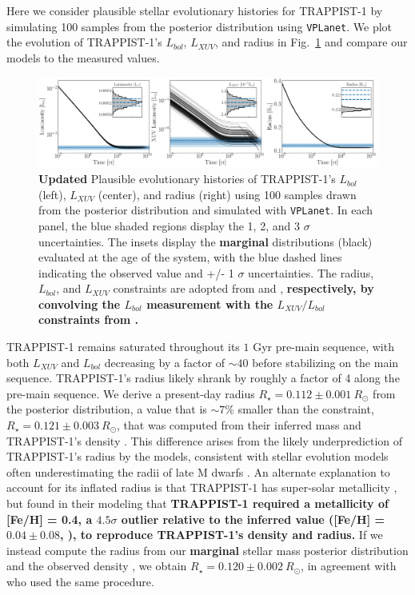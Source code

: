 \documentclass[twocolumn]{aastex62}
\newcommand{\xxx}[1]{{\textbf{#1}}}
\newcommand{\vplanet}[0]{\texttt{VPLanet}\xspace}
\begin{document}
Here we consider plausible stellar evolutionary histories for TRAPPIST-1 by simulating 100 samples from the posterior distribution using \vplanet. We plot the evolution of TRAPPIST-1's $L_{bol}$, $L_{XUV}$, and radius in Fig.~\ref{fig:evol} and compare our models to the measured values. 

\begin{figure}[t]
	\includegraphics[width=\textwidth]{../Analysis/Evol/trappist1Evol.pdf}
   \caption{\xxx{Updated} Plausible evolutionary histories of TRAPPIST-1's $L_{bol}$ (left), $L_{XUV}$ (center), and radius (right) using 100 samples drawn from the posterior distribution and simulated with \vplanet. In each panel, the blue shaded regions display the 1, 2, and 3 $\sigma$ uncertainties. The insets display the \xxx{marginal} distributions (black) evaluated at the age of the system, with the blue dashed lines indicating the observed value and +/- 1 $\sigma$ uncertainties. The radius, $L_{bol}$, and $L_{XUV}$ constraints are adopted from \citet{vanGrootel2018} and \citet{Wheatley2017}, \xxx{respectively, by convolving the \citet{vanGrootel2018} $L_{bol}$ measurement with the $L_{XUV}/L_{bol}$ constraints from \citet{Wheatley2017}.}}%
    \label{fig:evol}%
\end{figure}

TRAPPIST-1 remains saturated throughout its $1$ Gyr pre-main sequence, with both $L_{XUV}$ and $L_{bol}$ decreasing by a factor of ${\sim}40$ before stabilizing on the main sequence. TRAPPIST-1's radius likely shrank by roughly a factor of 4 along the pre-main sequence. We derive a present-day radius $R_{\star} = 0.112 \pm{0.001} \ R_{\odot}$ from the posterior distribution, a value that is ${\sim} 7\%$ smaller than the \citet{vanGrootel2018} constraint, $R_{\star} = 0.121 \pm {0.003} \ R_{\odot}$, that was computed from their inferred mass and TRAPPIST-1's density \citep{Delrez2018}. This difference arises from the likely underprediction of TRAPPIST-1's radius by the \citet{Baraffe2015} models, consistent with stellar evolution models often underestimating the radii of late M dwarfs \citep{Reid2005,Spada2013}. An alternate explanation to account for its inflated radius is that TRAPPIST-1 has super-solar metallicity \citep{Burgasser2017,vanGrootel2018}, but \citet{vanGrootel2018} found in their modeling that \xxx{TRAPPIST-1 required a metallicity of [Fe/H] = 0.4, a $4.5\sigma$ outlier relative to the inferred value ([Fe/H] = $0.04 \pm{0.08}$, \citet{Gillon2016}), to reproduce TRAPPIST-1's density and radius.} If we instead compute the radius from our \xxx{marginal} stellar mass posterior distribution and the observed density \citep{Delrez2018}, we obtain $R_{\star} = 0.120 \pm{0.002} \ R_{\odot}$, in agreement with \citet{vanGrootel2018} who used the same procedure.
\end{document}
